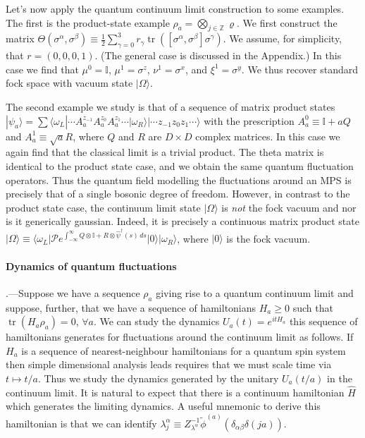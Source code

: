 \documentclass[prl,twocolumn,lengthcheck,superscriptaddress]{revtex4-1}
\newcommand{\tr}{\operatorname{tr}}
\theoremstyle{definition}
\theoremstyle{remark}
\begin{document}
Let's now apply the quantum continuum limit construction to some examples. The first is the product-state example $\rho_a = \bigotimes_{j\in\mathbb{Z}}\varrho$. We first construct the matrix $\Theta(\sigma^\alpha,\sigma^\beta) \equiv \frac12\sum_{\gamma=0}^3 r_\gamma \tr([\sigma^\alpha,\sigma^\beta]\sigma^\gamma)$. We assume, for simplicity, that $r = (0,0,0,1)$. (The general case is discussed in the Appendix.) In this case we find that $\mu^0 = \mathbb{I}$, $\mu^1 = \sigma^z$, $\nu^1 = \sigma^x$, and $\xi^1 = \sigma^y$. We thus recover standard fock space with vacuum state $|\Omega\rangle$.

The second example we study is that of a sequence of matrix product states $|\psi_a\rangle = \sum\langle \omega_L| \cdots A^{z_{-1}}_aA^{z_{0}}_a A^{z_{1}}_a\cdots |\omega_R\rangle |\cdots z_{-1}z_0z_{1} \cdots \rangle$
with the prescription $A^0_a \equiv \mathbb{I} + a Q$ and $A^1_a \equiv \sqrt{a} R$, where $Q$ and $R$ are $D\times D$ complex matrices. In this case we again find that the classical limit is a trivial product. The theta matrix is identical to the product state case, and we obtain the same quantum fluctuation operators. Thus the quantum field modelling the fluctuations around an MPS is precisely that of a single bosonic degree of freedom. However, in contrast to the product state case, the continuum limit state $|\Omega\rangle$ is \emph{not} the fock vacuum and nor is it generically gaussian. Indeed, it is precisely a continuous matrix product state $|\Omega\rangle \equiv \langle\omega_L|\mathcal{P}e^{\int_{-\infty}^\infty Q\otimes\mathbb{I} + R\otimes \widehat{\psi}^\dag(s)\,ds}|0\rangle|\omega_R\rangle$,  where $|0\rangle$ is the fock vacuum. 

\paragraph{Dynamics of quantum fluctuations}\hspace{-1em}.---Suppose we have a sequence $\rho_a$ giving rise to a quantum continuum limit and suppose, further, that we have a sequence  of hamiltonians $H_a\ge 0$ such that $\tr(H_a\rho_a) = 0$, $\forall a$. We can study the dynamics $U_a(t) = e^{itH_a}$ this sequence of hamiltonians generates for fluctuations around the continuum limit as follows. If $H_a$ is a sequence of nearest-neighbour hamiltonians for a quantum spin system then simple dimensional analysis leads requires that we must scale time via $t\mapsto t/a$. Thus we study the dynamics generated by the unitary $U_a(t/a)$ in the continuum limit. It is natural to expect that there is a continuum hamiltonian $\widehat{H}$ which generates the limiting dynamics. A useful mnemonic to derive this hamiltonian is that we can identify $\lambda^{\alpha}_{j} \equiv {Z_{\lambda^\alpha}^{-1}}\widetilde{\phi}^{(a)}(\delta_{\alpha\beta}\delta(ja))$. 
\end{document}
